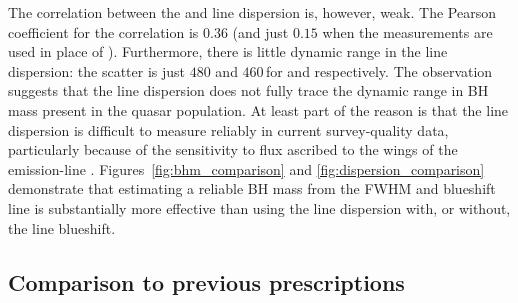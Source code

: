The correlation between the \ha and  line dispersion is, however, weak. 
The Pearson coefficient for the correlation is $0.36$ (and just $0.15$ when the \hb measurements are used in place of \hans). 
Furthermore, there is little dynamic range in the line dispersion: the scatter is just $480$ and $460$\,\kms for \ha and  respectively. 
The observation suggests that the line dispersion does not fully trace the dynamic range in BH mass present in the quasar population. 
At least part of the reason is that the line dispersion is difficult to measure reliably in current survey-quality data, particularly because of the sensitivity to flux ascribed to the wings of the emission-line \citep[e.g.][]{mejia-restrepo16}.
Figures~\ref{fig:bhm_comparison} and \ref{fig:dispersion_comparison} demonstrate that estimating a reliable BH mass from the  FWHM and blueshift line is substantially more effective than using the  line dispersion with, or without, the line blueshift. 

\subsection{Comparison to previous prescriptions}

